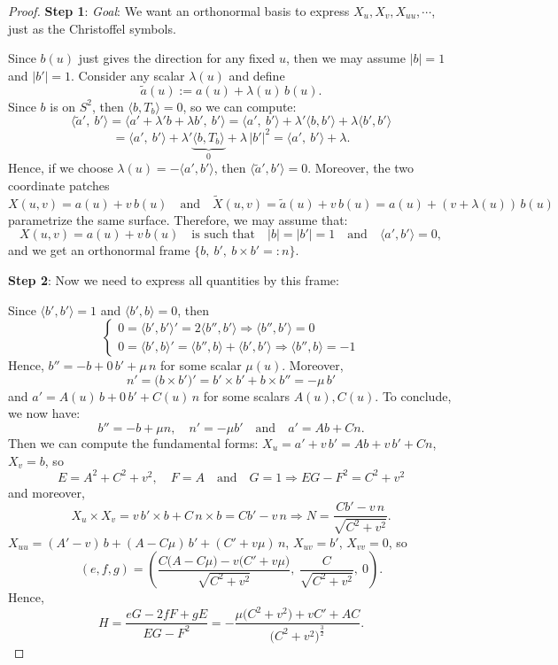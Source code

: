 \begin{proof}
\textbf{Step 1}: \textit{Goal}: We want an orthonormal basis to express $X_u, X_v, X_{uu}, \cdots$, just as the Christoffel symbols.

\noindent Since $b(u)$ just gives the direction for any fixed $u$, then we may assume $|b| = 1$ and $|b'| = 1$. Consider any scalar $\lambda(u)$ and define
\[
\tilde{a}(u) := a(u) + \lambda(u)\,b(u).
\]
Since $b$ is on $S^2$, then $\langle b,T_b\rangle=0$, so we can compute:
\[
\big\langle\tilde{a}',\ b'\big\rangle = \big\langle a' + \lambda'b + \lambda b',\ b'\big\rangle = \big\langle a',\ b'\big\rangle + \lambda'\langle b, b'\rangle + \lambda\big\langle b', b'\big\rangle
\]
\[
= \big\langle a',\ b'\big\rangle + \lambda'\underbrace{\langle b, T_b\rangle}_{0} + \lambda\,|b'|^2 = \big\langle a',\ b'\big\rangle + \lambda.
\]
Hence, if we choose $\lambda(u) = -\langle a', b'\rangle$, then $\big\langle\tilde{a}', b'\big\rangle = 0$. Moreover, the two coordinate patches
\[
X(u, v) = a(u) + v\,b(u) \quad\text{and}\quad \widetilde{X}(u, v) = \tilde{a}(u) + v\,b(u) = a(u) + (v + \lambda(u))\,b(u)
\]
parametrize the same surface. Therefore, we may assume that:
\[
X(u, v) = a(u) + v\,b(u) \quad\text{is such that}\quad |b| = |b'| = 1 \quad\text{and}\quad \big\langle a', b'\big\rangle = 0,
\]
and we get an orthonormal frame $\{b,\ b',\ b\times b' =: n\}$.

\noindent\textbf{Step 2}: Now we need to express all quantities by this frame:

\noindent Since $\langle b', b'\rangle = 1$ and $\langle b', b\rangle = 0$, then
\[
\begin{cases}
0 = \big\langle b', b'\big\rangle' = 2\big\langle b'', b'\big\rangle \Rightarrow \big\langle b'', b'\big\rangle = 0\\[2mm]
0 = \big\langle b', b\big\rangle' = \big\langle b'', b\big\rangle + \big\langle b', b'\big\rangle \Rightarrow \big\langle b'', b\big\rangle = -1
\end{cases}
\]
Hence, $b'' = -b + 0\,b' + \mu\,n$ for some scalar $\mu(u)$. Moreover,
\[
n' = \big(b\times b'\big)' = b'\times b' + b\times b'' = -\mu\,b'
\]
and $a' = A(u)\,b + 0\,b' + C(u)\,n$ for some scalars $A(u), C(u)$. To conclude, we now have:
\[
b'' = -b + \mu n, \quad n' = -\mu b' \quad\text{and}\quad a' = Ab + Cn.
\]
Then we can compute the fundamental forms: $X_u = a' + v\,b' = Ab + v\,b' + Cn$, $X_v = b$, so
\[
E = A^2 + C^2 + v^2, \quad F = A \quad\text{and}\quad G = 1 \Rightarrow EG - F^2 = C^2 + v^2
\]
and moreover,
\[
X_u\times X_v = v\,b'\times b + C\,n\times b = Cb' - v\,n \Rightarrow N = \frac{Cb' - v\,n}{\sqrt{C^2 + v^2}}.
\]
$X_{uu} = (A' - v)\,b + (A - C\mu)\,b' + (C' + v\mu)\,n$, $X_{uv} = b'$, $X_{vv} = 0$, so
\[
(e, f, g) = \left(\frac{C\big(A - C\mu\big) - v\big(C' + v\mu\big)}{\sqrt{C^2 + v^2}},\ \frac{C}{\sqrt{C^2 + v^2}},\ 0\right).
\]
Hence,
\[
H = \frac{eG - 2fF + gE}{EG - F^2} = -\frac{\mu\big(C^2 + v^2\big) + vC' + AC}{\big(C^2 + v^2\big)^{\frac{3}{2}}}.
\]


\end{proof}
